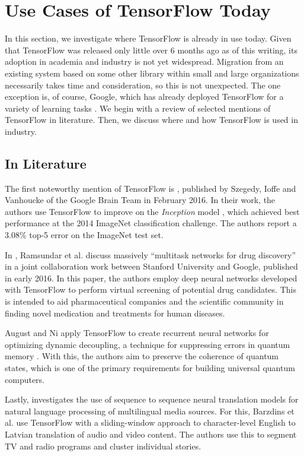 \section{Use Cases of TensorFlow Today}\label{sec:uses}

In this section, we investigate where TensorFlow is already in use today. Given
that TensorFlow was released only little over 6 months ago as of this writing,
its adoption in academia and industry is not yet widespread. Migration from an
existing system based on some other library within small and large organizations
necessarily takes time and consideration, so this is not unexpected. The one
exception is, of course, Google, which has already deployed TensorFlow for a
variety of learning tasks \cite{drugs, phones, emails, deepmind, inception}. We
begin with a review of selected mentions of TensorFlow in literature. Then, we
discuss where and how TensorFlow is used in industry.

\subsection{In Literature}\label{sec:uses-lit}

The first noteworthy mention of TensorFlow is \cite{szegedy2016}, published by
Szegedy, Ioffe and Vanhoucke of the Google Brain Team in February 2016. In their
work, the authors use TensorFlow to improve on the \emph{Inception} model
\cite{inception}, which achieved best performance at the 2014 ImageNet
classification challenge. The authors report a 3.08\% top-5 error on the
ImageNet test set.

In \cite{drugs}, Ramsundar et al. discuss massively ``multitask networks for
drug discovery'' in a joint collaboration work between Stanford University and
Google, published in early 2016. In this paper, the authors employ deep neural
networks developed with TensorFlow to perform virtual screening of potential
drug candidates. This is intended to aid pharmaceutical companies and the
scientific community in finding novel medication and treatments for human
diseases.

August and Ni apply TensorFlow to create recurrent neural networks for
optimizing dynamic decoupling, a technique for suppressing errors in quantum
memory \cite{august}. With this, the authors aim to preserve the coherence of
quantum states, which is one of the primary requirements for building universal
quantum computers.

Lastly, \cite{barzdins2016} investigates the use of sequence to sequence neural
translation models for natural language processing of multilingual media
sources. For this, Barzdins et al. use TensorFlow with a sliding-window approach
to character-level English to Latvian translation of audio and video
content. The authors use this to segment TV and radio programs and cluster
individual stories.

